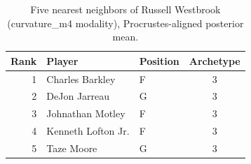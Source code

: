 \begin{table}[htbp]
  \centering\small
  \begin{tabular}{rllc}
    \toprule
    Rank & Player & Position & Archetype \\
    \midrule
    1 & Charles Barkley & F & 3 \\
    2 & DeJon Jarreau & G & 3 \\
    3 & Johnathan Motley & F & 3 \\
    4 & Kenneth Lofton Jr. & F & 3 \\
    5 & Taze Moore & G & 3 \\
    \bottomrule
  \end{tabular}
  \caption{Five nearest neighbors of Russell Westbrook (curvature_m4 modality), Procrustes-aligned posterior mean.}
  \label{tab:Russell_Westbrook_neighbors_curvature_m4}
\end{table}

